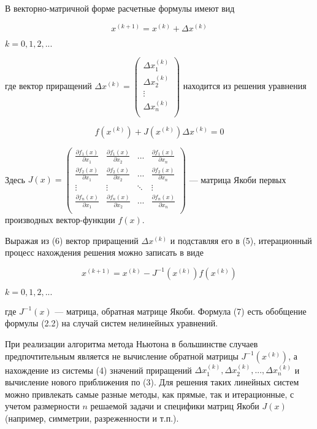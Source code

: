 В векторно-матричной форме расчетные формулы имеют вид

\begin{equation}\label{eq:pythagoras}
x^{(k + 1)} = x^{(k)} + \Delta x^{(k)}
\end{equation}

$k = 0, 1, 2, ...$

где вектор приращений
$
\Delta x^{(k)} = 
\begin{pmatrix}
    \Delta x_1^{(k)} \\
    \Delta x_2^{(k)} \\
    \vdots \\
    \Delta x_n^{(k)} \\
\end{pmatrix}
$
находится из решения уравнения

\begin{equation}\label{eq:pythagoras}
f(x^{(k)}) + J(x^{(k)}) \Delta x^{(k)} = 0
\end{equation}

Здесь
$
J(x) =
\begin{pmatrix}
\frac{\partial f_1(x)}{\partial x_1} & \frac{\partial f_1(x)}{\partial x_2} & ... & \frac{\partial f_1(x)}{\partial x_n} \\
\frac{\partial f_2(x)}{\partial x_1} & \frac{\partial f_2(x)}{\partial x_2} & ... & \frac{\partial f_2(x)}{\partial x_n} \\
\vdots & \vdots & \ddots & \vdots \\
\frac{\partial f_n(x)}{\partial x_1} & \frac{\partial f_n(x)}{\partial x_2} & ... & \frac{\partial f_n(x)}{\partial x_n} \\
\end{pmatrix}
$
--- матрица Якоби первых производных вектор-функции $f(x)$.

Выражая из (6) вектор приращений $\Delta x^{(k)}$ и подставляя его в (5), итерационный процесс нахождения решения можно записать в виде

\begin{equation}\label{eq:pythagoras}
    x^{(k + 1)} = x^{(k)} - J^{-1}(x^{(k)})f(x^{(k)})
\end{equation}

$k = 0, 1, 2, ...$

где $J^{-1}(x)$ --- матрица, обратная матрице Якоби. Формула (7) есть обобщение формулы
(2.2) на случай систем нелинейных уравнений. 

При реализации алгоритма метода Ньютона в большинстве случаев
предпочтительным является не вычисление обратной матрицы $J^{-1}(x^{(k)})$, а нахождение из
системы (4) значений приращений $\Delta x_1^{(k)}, \Delta x_2^{(k)}, ..., \Delta x_n^{(k)}$ и вычисление нового
приближения по (3). Для решения таких линейных систем можно привлекать самые
разные методы, как прямые, так и итерационные, с учетом размерности $n$ решаемой задачи и специфики матриц Якоби
$J(x)$ (например, симметрии, разреженности и т.п.).

